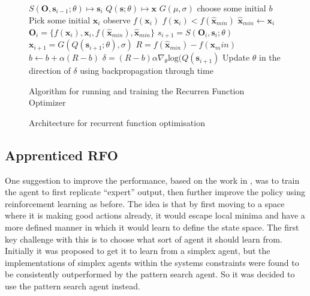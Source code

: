 \begin{figure}
\centering
\begin{minipage}{.8\textwidth}
\begin{algorithmic}
\State $S(\boldsymbol{O}, \boldsymbol{s}_{i-1}; \theta) \mapsto \boldsymbol{s}_i$
\State $Q(\boldsymbol{s} ;\theta) \mapsto \boldsymbol{x} $
\State $G(\mu,\sigma)$  
\State choose some initial $b$ 
 \Repeat
 	\State Pick some initial $\boldsymbol{x}_i$
 	\Repeat
 		\State observe $f(\boldsymbol{x}_i)$
 		\If $f(\boldsymbol{x}_i) < f(\hat{\boldsymbol{x}}_{min})$
 			\State$ \hat{\boldsymbol{x}}_{min} \gets \boldsymbol{x}_i$
 		\EndIf
 		\State $\boldsymbol{O}_i = \{f(\boldsymbol{x}_i),\boldsymbol{x}_i, f(\hat{\boldsymbol{x}}_{min}), \hat{\boldsymbol{x}}_{min}\} $
 		\State $s_{i+1} = S(\boldsymbol{O}_i, \boldsymbol{s}_{i}; \theta)$
 		\State $\boldsymbol{x}_{i+1} = G(Q(\boldsymbol{s}_{i+1};\theta),\sigma)$ 
	\State $R = f(\hat{\boldsymbol{x}}_{min}) - f(\boldsymbol{x}_min)$
	\State $b \gets b  + \alpha (R - b)$ 
	\State $\delta = (R - b) \alpha \nabla_\theta \text{log}(Q(\boldsymbol{s}_{i+1})$
	\State Update $\theta$ in the direction of $\delta$ using backpropagation through time
 \end{algorithmic}
 \end{minipage}
 \caption{Algorithm for running and training the Recurren Function Optimizer}
 \label{alg:rfo}
\end{figure}

\begin{figure}
\centering

\caption{Architecture for recurrent function optimisation}
\label{fig:RFOarch}
\end{figure}

\subsection{Apprenticed RFO}
One suggestion to improve the performance, based on the work in \cite{alphaGO}, was to train the agent to first replicate ``expert'' output, then further improve the policy using reinforcement learning as before. The idea is that by first moving to a space where it is making good actions already, it would escape local minima and have a more defined manner in which it would learn to define the state space. The first key challenge with this is to choose what sort of agent it should learn from. Initially it was proposed to get it to learn from a simplex agent, but the implementations of simplex agents within the systems constraints were found to be consistently outperformed by the pattern search agent. So it was decided to use the pattern search agent instead. 

